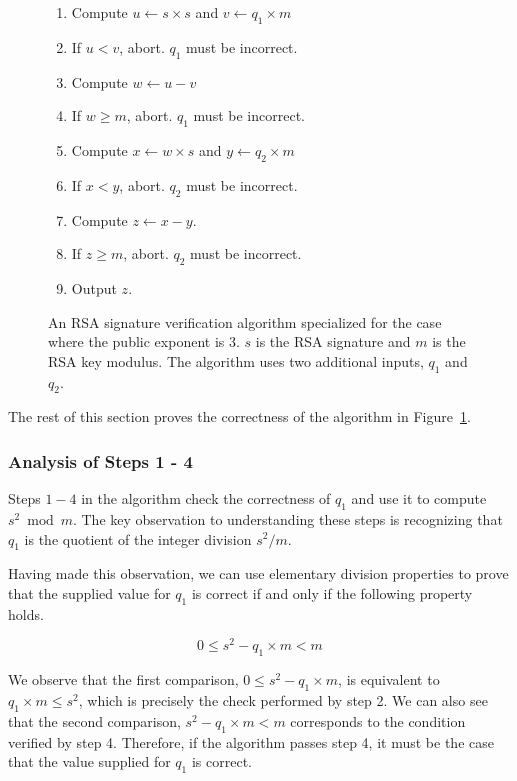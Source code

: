 \begin{figure}[hbt]
  \begin{enumerate}
    \item Compute $u \leftarrow s \times s$ and $v \leftarrow q_1 \times m$
    \item If $u < v$, abort. $q_1$ must be incorrect.
    \item Compute $w \leftarrow u - v$
    \item If $w \ge m$, abort. $q_1$ must be incorrect.
    \item Compute $x \leftarrow w \times s$ and $y \leftarrow q_2 \times m$
    \item If $x < y$, abort. $q_2$ must be incorrect.
    \item Compute $z \leftarrow x - y$.
    \item If $z \ge m$, abort. $q_2$ must be incorrect.
    \item Output $z$.
  \end{enumerate}
  \caption{
    An RSA signature verification algorithm specialized for the case where
    the public exponent is 3. $s$ is the RSA signature and $m$ is the RSA key
    modulus. The algorithm uses two additional inputs, $q_1$ and $q_2$.
  }
  \label{fig:sgx_sig_verification}
\end{figure}

The rest of this section proves the correctness of the algorithm in
Figure~\ref{fig:sgx_sig_verification}.


\subsubsection{Analysis of Steps 1 - 4}

Steps $1 - 4$ in the algorithm check the correctness of $q_1$ and use it
to compute $s^2 \bmod m$. The key observation to understanding these steps is
recognizing that $q_1$ is the quotient of the integer division $s^2 / m$.

Having made this observation, we can use elementary division properties to
prove that the supplied value for $q_1$ is correct if and only if the following
property holds.

$$ 0 \le s^2 - q_1 \times m < m $$

We observe that the first comparison, $0 \le s^2 - q_1 \times m$, is equivalent
to $q_1 \times m \le s^2$, which is precisely the check performed by step 2. We
can also see that the second comparison, $s^2 - q_1 \times m < m$ corresponds
to the condition verified by step 4. Therefore, if the algorithm passes step 4,
it must be the case that the value supplied for $q_1$ is correct.

